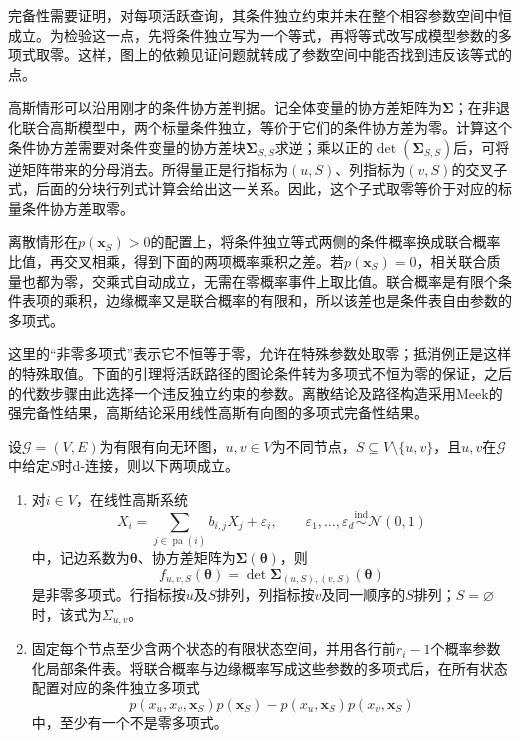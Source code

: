 完备性需要证明，对每项活跃查询，其条件独立约束并未在整个相容参数空间中恒成立。为检验这一点，先将条件独立写为一个等式，再将等式改写成模型参数的多项式取零。这样，图上的依赖见证问题就转成了参数空间中能否找到违反该等式的点。

高斯情形可以沿用刚才的条件协方差判据。记全体变量的协方差矩阵为$\bm\Sigma$；在非退化联合高斯模型中，两个标量条件独立，等价于它们的条件协方差为零。计算这个条件协方差需要对条件变量的协方差块$\bm\Sigma_{S,S}$求逆；乘以正的$\det(\bm\Sigma_{S,S})$后，可将逆矩阵带来的分母消去。所得量正是行指标为$(u,S)$、列指标为$(v,S)$的交叉子式，后面的分块行列式计算会给出这一关系。因此，这个子式取零等价于对应的标量条件协方差取零。

离散情形在$p(\bm x_S)>0$的配置上，将条件独立等式两侧的条件概率换成联合概率比值，再交叉相乘，得到下面的两项概率乘积之差。若$p(\bm x_S)=0$，相关联合质量也都为零，交乘式自动成立，无需在零概率事件上取比值。联合概率是有限个条件表项的乘积，边缘概率又是联合概率的有限和，所以该差也是条件表自由参数的多项式。

这里的“非零多项式”表示它不恒等于零，允许在特殊参数处取零；抵消例正是这样的特殊取值。下面的引理将活跃路径的图论条件转为多项式不恒为零的保证，之后的代数步骤由此选择一个违反独立约束的参数。离散结论及路径构造采用Meek的强完备性结果，高斯结论采用线性高斯有向图的多项式完备性结果。

\begin{lemma}[条件独立约束的非平凡性]
  \label{lem:pgm-directed-nontrivial}
  设$\mathcal{G}=(V,E)$为有限有向无环图，$u,v\in V$为不同节点，$S\subseteq V\setminus\{u,v\}$，且$u,v$在$\mathcal{G}$中给定$S$时d-连接，则以下两项成立。
  \begin{enumerate}
    \item 对$i\in V$，在线性高斯系统
    \[
      X_i=\sum_{j\in\operatorname{pa}(i)}b_{i,j}X_j+\varepsilon_i,
      \qquad
      \varepsilon_1,\ldots,\varepsilon_d
      \mathrel{\overset{\mathrm{ind}}{\sim}}\mathcal N(0,1)
    \]
    中，记边系数为$\bm{\theta}$、协方差矩阵为$\bm{\Sigma}(\bm{\theta})$，则
    \[
      f_{u,v,S}(\bm{\theta})
      =\det\bm{\Sigma}_{(u,S),(v,S)}(\bm{\theta})
    \]
    是非零多项式。行指标按$u$及$S$排列，列指标按$v$及同一顺序的$S$排列；$S=\varnothing$时，该式为$\Sigma_{u,v}$。
    \item 固定每个节点至少含两个状态的有限状态空间，并用各行前$r_i-1$个概率参数化局部条件表。将联合概率与边缘概率写成这些参数的多项式后，在所有状态配置对应的条件独立多项式
    \[
      p(x_u,x_v,\bm{x}_S)p(\bm{x}_S)
      -p(x_u,\bm{x}_S)p(x_v,\bm{x}_S)
    \]
    中，至少有一个不是零多项式。
  \end{enumerate}
\end{lemma}

